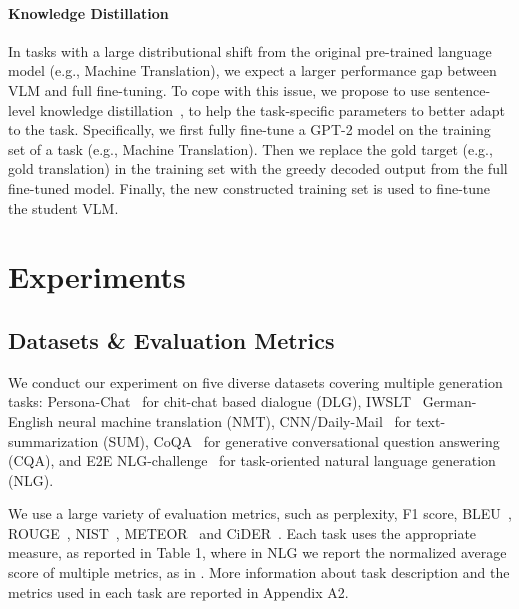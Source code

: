 \paragraph{Knowledge Distillation} In tasks with a large distributional shift from the original pre-trained language model (e.g., Machine Translation), we expect a larger performance gap between VLM and full fine-tuning. To cope with this issue, we propose to use sentence-level knowledge distillation~\cite{kim2016sequence}, to help the task-specific parameters to better adapt to the task. Specifically, we first fully fine-tune a GPT-2 model on the training set of a task (e.g., Machine Translation). Then we replace the gold target (e.g., gold translation) in the training set with the greedy decoded output from the full fine-tuned model. Finally, the new constructed training set is used to fine-tune the student VLM.

\section{Experiments}

\subsection{Datasets \& Evaluation Metrics} We conduct our experiment on five diverse datasets covering multiple generation tasks: Persona-Chat~\cite{zhang2018personalizing,dinan2019second} for chit-chat based dialogue (DLG), IWSLT~\cite{cettolo2016iwslt} German-English neural machine translation (NMT), CNN/Daily-Mail~\cite{hermann2015teaching,nallapati2016abstractive} for text-summarization (SUM), CoQA~\cite{reddy2019coqa} for generative conversational question answering (CQA), and E2E NLG-challenge~\cite{dusek2019e2e} for task-oriented natural language generation (NLG). 

We use a large variety of evaluation metrics, such as perplexity, F1 score, BLEU~\cite{papineni2002bleu}, ROUGE~\cite{lin2004rouge}, NIST~\cite{lin2004automatic}, METEOR~\cite{denkowski:lavie:meteor-wmt:2014} and CiDER~\cite{vedantam2015cider}. Each task uses the appropriate measure, as reported in Table 1, where in NLG we report the normalized average score of multiple metrics, as in \citet{dusek2019e2e}. More information about task description and the metrics used in each task are reported in Appendix A2. 

